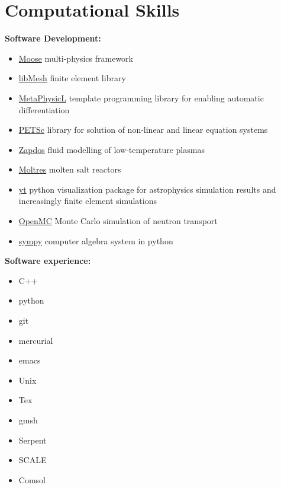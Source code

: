 \documentclass[a4paper,10pt]{article} %
\newcounter{magicrownumbers}
\begin{document}

\pagebreak


\setcounter{magicrownumbers}{0}



\FloatBarrier


\section{Computational Skills}

\textbf{Software Development:}
\begin{itemize}[noitemsep]
\item \href{https://github.com/idaholab/moose}{Moose} multi-physics framework
\item \href{https://github.com/libmesh/libmesh}{libMesh} finite element library
\item \href{https://github.com/roystgnr/metaphysicl}{MetaPhysicL} template programming library for enabling automatic differentiation
\item \href{https://bitbucket.org/petsc/petsc}{PETSc} library for solution of non-linear and linear equation systems
\item \href{https://github.com/shannon-lab/zapdos}{Zapdos} fluid modelling of low-temperature plasmas
\item \href{https://github.com/arfc/moltres}{Moltres} molten salt reactors
\item \href{https://bitbucket.org/yt/yt\_analysis}{yt} python visualization package for astrophysics simulation results and increasingly finite element simulations
\item \href{https://github.com/mit-crpg/openmc}{OpenMC} Monte Carlo simulation of neutron transport
\item \href{https://github.com/sympy/sympy}{sympy} computer algebra system in python
\end{itemize}

\textbf{Software experience:}
\begin{itemize}[noitemsep]
\item C++
\item python
\item git
\item mercurial
\item emacs
\item Unix
\item Tex
\item gmsh
\item Serpent
\item SCALE
\item Comsol
\end{itemize}
\end{document}
